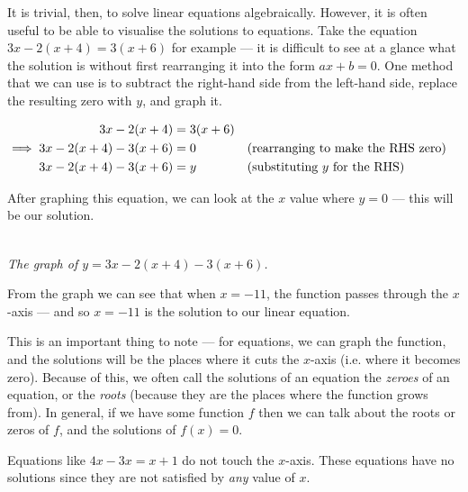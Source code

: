 \documentclass[a4paper,10pt,titlepage]{article}
\theoremstyle{definition}
\begin{document}
It is trivial, then, to solve linear equations algebraically. However, it is often useful to be
able to visualise the solutions to equations. Take the equation $ 3x - 2(x+4) = 3(x+6) $
for example --- it is difficult to see at a glance what the solution is without first
rearranging it into the form $ ax + b = 0 $. One method that we can use is to subtract the
right-hand side from the left-hand side, replace the resulting zero  with $ y $, and graph it.

\begin{align*}
                      3x - 2(x + 4) &= 3(x + 6) \\
  \implies 3x - 2(x + 4) - 3(x + 6) &= 0        &&\text{(rearranging to make the RHS zero)}\\
           3x - 2(x + 4) - 3(x + 6) &= y        &&\text{(substituting $ y $ for the RHS)}
\end{align*}

After graphing this equation, we can look at the $ x $ value where $ y = 0 $ --- this will
be our solution.

\begin{center}\\
\textit{The graph of $ y = 3x - 2(x + 4) - 3(x + 6) $.}
\end{center}

From the graph we can see that when $ x = -11 $, the function passes through the $ x$-axis --- and so $ x = -11 $ is
the solution to our linear equation.

This is an important thing to note --- for equations, we can graph the function, and
the solutions will be the places where it cuts the $ x$-axis (i.e. where it becomes
zero). Because of this, we often call the solutions of an equation the \emph{zeroes}
of an equation, or the \emph{roots} (because they are the places where the function
grows from). In general, if we have some function $ f $ then we can talk about the
roots or zeros of $ f $, and the solutions of $ f(x) = 0 $.

Equations like $ 4x-3x = x+1 $ do not touch the $x$-axis. These equations have no
solutions since they are not satisfied by \emph{any} value of $ x $.
\end{document}
